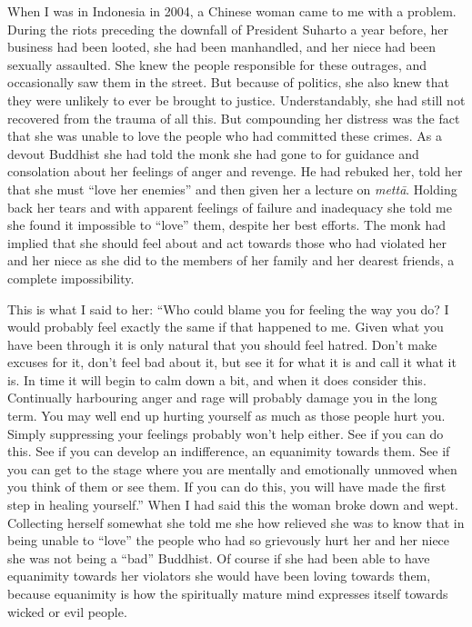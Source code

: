 \documentclass[10pt, openright]{book}
\begin{document}
When I was in Indonesia in 2004, a Chinese woman came to me with a problem. During the riots preceding the downfall of President Suharto a year before, her business had been looted, she had been manhandled, and her niece had been sexually assaulted. She knew the people responsible for these outrages, and occasionally saw them in the street. But because of politics, she also knew that they were unlikely to ever be brought to justice. Understandably, she had still not recovered from the trauma of all this. But compounding her distress was the fact that she was unable to love the people who had committed these crimes. As a devout Buddhist she had told the monk she had gone to for guidance and consolation about her feelings of anger and revenge. He had rebuked her, told her that she must “love her enemies” and then given her a lecture on \textit{mettā}. Holding back her tears and with apparent feelings of failure and inadequacy she told me she found it impossible to “love” them, despite her best efforts. The monk had implied that she should feel about and act towards those who had violated her and her niece as she did to the members of her family and her dearest friends, a complete impossibility.


This is what I said to her: “Who could blame you for feeling the way you do? I would probably feel exactly the same if that happened to me. Given what you have been through it is only natural that you should feel hatred. Don’t make excuses for it, don’t feel bad about it, but see it for what it is and call it what it is. In time it will begin to calm down a bit, and when it does consider this. Continually harbouring anger and rage will probably damage you in the long term. You may well end up hurting yourself as much as those people hurt you. Simply suppressing your feelings probably won’t help either. See if you can do this. See if you can develop an indifference, an equanimity towards them. See if you can get to the stage where you are mentally and emotionally unmoved when you think of them or see them. If you can do this, you will have made the first step in healing yourself.” When I had said this the woman broke down and wept. Collecting herself somewhat she told me she how relieved she was to know that in being unable to “love” the people who had so grievously hurt her and her niece she was not being a “bad” Buddhist. Of course if she had been able to have equanimity towards her violators she would have been loving towards them, because equanimity is how the spiritually mature mind expresses itself towards wicked or evil people.
\end{document}
